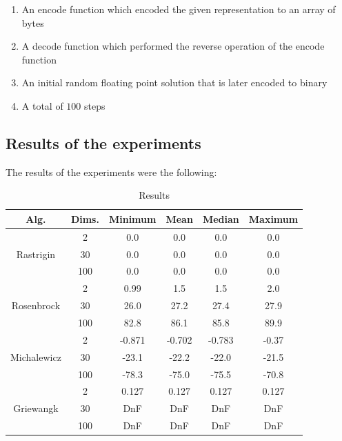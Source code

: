 \documentclass[conference]{IEEEtran}
\begin{document}
\begin{enumerate}
    \item An encode function which encoded the given representation to an array of bytes
    \item A decode function which performed the reverse operation of the encode function
    \item An initial random floating point solution that is later encoded to binary
    \item A total of $100$ steps
\end{enumerate}

\subsection{Results of the experiments}
The results of the experiments were the following:

\begin{table}[!htbp]
    \caption{Results}
    \centering
    \begin{tabular}{|c c|c c c c|}
        \hline
        Alg. & Dims. & Minimum & Mean & Median & Maximum \\
        \hline
        \multirow{3}{*}{Rastrigin} & 2 & 0.0 & 0.0 & 0.0 & 0.0 \\
        & 30 & 0.0 & 0.0 & 0.0 & 0.0 \\
        & 100 & 0.0 & 0.0 & 0.0 & 0.0 \\
        \hline
        \multirow{3}{*}{Rosenbrock} & 2 & 0.99 & 1.5 & 1.5 & 2.0 \\
        & 30 & 26.0 & 27.2 & 27.4 & 27.9 \\
        & 100 & 82.8 & 86.1 & 85.8 & 89.9 \\
        \hline
        \multirow{3}{*}{Michalewicz} & 2 & -0.871 & -0.702 & -0.783 & -0.37 \\
        & 30 & -23.1 & -22.2 & -22.0 & -21.5 \\
        & 100 & -78.3 & -75.0 & -75.5 & -70.8 \\
        \hline
        \multirow{3}{*}{Griewangk} & 2 & 0.127 & 0.127 & 0.127 & 0.127 \\
        & 30 & DnF & DnF & DnF & DnF \\
        & 100 & DnF & DnF & DnF & DnF \\
        \hline
    \end{tabular}
\end{table}
\end{document}
